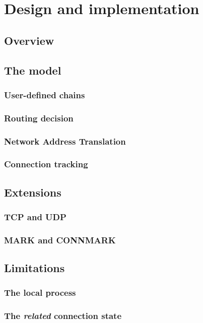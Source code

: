 \chapter{Design and implementation}\label{chapter:design}

\section{Overview}

\section{The model}
\subsection{User-defined chains}
\subsection{Routing decision}
\subsection{Network Address Translation}
\subsection{Connection tracking}

\section{Extensions}
\subsection{TCP and UDP}
\subsection{MARK and CONNMARK}

\section{Limitations}
\subsection{The local process}
\subsection{The \emph{related} connection state}
